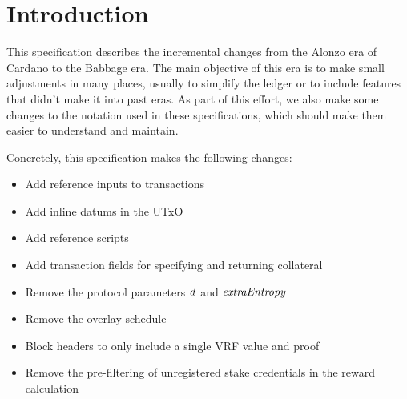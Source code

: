 \section{Introduction}

This specification describes the incremental changes from the Alonzo
era of Cardano to the Babbage era. The main objective of this era is
to make small adjustments in many places, usually to simplify the
ledger or to include features that didn't make it into past eras. As
part of this effort, we also make some changes to the notation used in
these specifications, which should make them easier to understand and
maintain.

Concretely, this specification makes the following changes:
\begin{itemize}
\item Add reference inputs to transactions
\item Add inline datums in the UTxO
\item Add reference scripts
\item Add transaction fields for specifying and returning collateral
\item Remove the protocol parameters $\mathit{d}$ and $\mathit{extraEntropy}$
\item Remove the overlay schedule
\item Block headers to only include a single VRF value and proof
\item Remove the pre-filtering of unregistered stake credentials in the reward calculation
\end{itemize}
